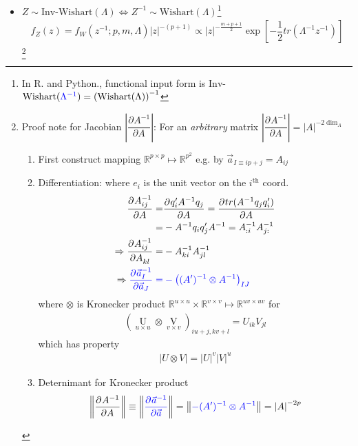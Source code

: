 \begin{itemize}[topsep=2pt,itemsep=0pt]
\begin{itemize}[topsep=2pt,itemsep=0pt]
        \item $ Z\sim \mathrm{Inv}  $-$ \mathrm{Wishart}(\Lambda )\Leftrightarrow Z^{-1}\sim \mathrm{Wishart}(\Lambda )   $\footnote{In R. and Python., functional input form is $\mathrm{Inv}$-$ \mathrm{Wishart}({\color{blue}\Lambda^{-1}} )=\left(\mathrm{Wishart}(\Lambda ) \right)^{-1}  $}
        \begin{align*}
            f_Z(z)= f_W(z^{-1};p,m,\Lambda )\left|z\right|^{-(p+1)} \propto |z|^{-\frac{m+p+1}{2}}\exp\left[ -\dfrac{1}{2}tr(\Lambda ^{-1}z^{-1}) \right]
        \end{align*}
        \footnote{Proof note for Jacobian $ \left|\dfrac{\partial^{}A^{-1}}{\partial A^{}}\right| $: For an \textit{arbitrary} matrix $ \left|\dfrac{\partial^{}A^{-1}}{\partial A^{}}\right| = |A|^{-2\dim_A}$
        \begin{enumerate}[topsep=2pt,itemsep=0pt]
            \item First construct mapping $ \mathbb{R}^{p\times p}\mapsto \mathbb{R}^{p^2} $ e.g. by $ \vec{a}_{I\equiv ip+j}=A_{ij} $
            \item Differentiation: where $ e_i $ is the unit vector on the $ i^\mathrm{th}  $ coord.
            \begin{align*}
                \dfrac{\partial^{} A^{-1}_{ij}}{\partial A ^{}} =& \dfrac{\partial^{} q_i'A^{-1}q_j}{\partial A^{}}= \dfrac{\partial^{} tr(A^{-1}q_jq_i')}{\partial A^{}}\\
                =&-A^{-1}q_iq_j'A^{-1}=A^{-1}_{:i}A^{-1}_{j:}\\
                \Rightarrow \dfrac{\partial^{} A^{-1}_{ij}}{\partial A_{kl} ^{}}=&-A^{-1}_{ki}A^{-1}_{jl}\\
                \Rightarrow \color{blue}\dfrac{\partial^{} \vec{a}^{-1}_I}{\partial\vec{a}_J}=&\color{blue}-\left( (A')^{-1}\otimes A^{-1} \right)_{IJ}
            \end{align*}
            where $ \otimes $ is Kronecker product $ \mathbb{R}^{u\times u}\times \mathbb{R}^{v\times v}\mapsto \mathbb{R}^{uv\times uv} $ for 
            \begin{align*}
                (\mathop{U}\limits_{u\times u} \otimes \mathop{V}\limits_{v\times v} )_{iu+j,kv+l}=U_{ik}V_{jl} 
            \end{align*}
            which has property
            \begin{align*}
                 \left|U\otimes V\right|=\left|U\right|^{v}\left|V \right|^{u}
            \end{align*}
            \item Deternimant for Kronecker product
            \begin{align*}
                \left\Vert\dfrac{\partial^{} A^{-1}}{\partial A^{}}\right\Vert\equiv \left\Vert{\color{blue} \dfrac{\partial^{} \vec{a}^{-1}}{\partial \vec{a}}}\right\Vert = \left\Vert {\color{blue}-(A')^{-1}\otimes A^{-1} }\right\Vert=\left|A\right|^{-2p}
            \end{align*}
        \end{enumerate}

}
\end{itemize}
\end{itemize}

